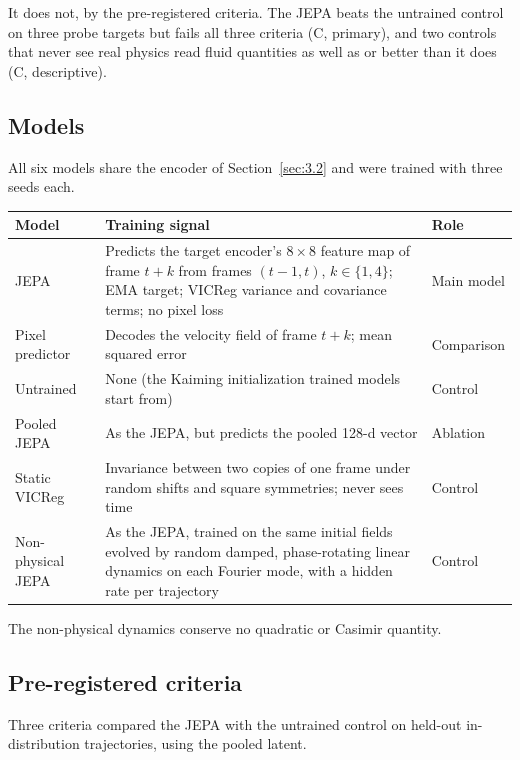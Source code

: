 \documentclass[10pt]{article}
\begin{document}
It does not, by the pre-registered criteria. The JEPA beats the untrained control on three probe targets but fails all three criteria (C, primary), and two controls that never see real physics read fluid quantities as well as or better than it does (C, descriptive).

\subsection{Models}\label{sec:4.1}

All six models share the encoder of Section~\ref{sec:3.2} and were trained with three seeds each.

\begin{table}[htbp]
\centering
\small
\begin{tabularx}{\linewidth}{l>{\raggedright\arraybackslash}Xl}
\toprule
Model & Training signal & Role \\
\midrule
JEPA & Predicts the target encoder's $8 \times 8$ feature map of frame $t + k$ from frames $(t - 1, t)$, $k \in \{1, 4\}$; EMA target; VICReg variance and covariance terms; no pixel loss & Main model \\
Pixel predictor & Decodes the velocity field of frame $t + k$; mean squared error & Comparison \\
Untrained & None (the Kaiming initialization trained models start from) & Control \\
Pooled JEPA & As the JEPA, but predicts the pooled 128-d vector & Ablation \\
Static VICReg & Invariance between two copies of one frame under random shifts and square symmetries; never sees time & Control \\
Non-physical JEPA & As the JEPA, trained on the same initial fields evolved by random damped, phase-rotating linear dynamics on each Fourier mode, with a hidden rate per trajectory & Control \\
\bottomrule
\end{tabularx}
\end{table}

The non-physical dynamics conserve no quadratic or Casimir quantity.

\subsection{Pre-registered criteria}\label{sec:4.2}

Three criteria compared the JEPA with the untrained control on held-out in-distribution trajectories, using the pooled latent.
\end{document}
